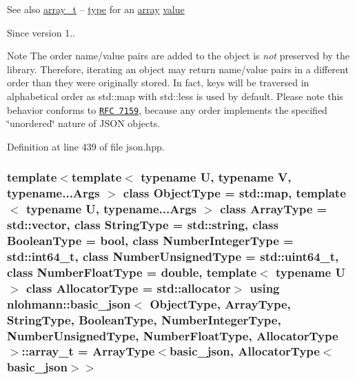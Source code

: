 \begin{DoxySeeAlso}{See also}
\hyperlink{classnlohmann_1_1basic__json_ab00b882d39306d663c23dab110f5cae0}{array\+\_\+t} -- \hyperlink{classnlohmann_1_1basic__json_a848cbae3bd3502ffbf738320bf5eb3aa}{type} for an \hyperlink{classnlohmann_1_1basic__json_a5685815624b086caa532f41e853d4b0f}{array} \hyperlink{classnlohmann_1_1basic__json_a0a2cbbd95862a623e7dc5c37e67dead0}{value}
\end{DoxySeeAlso}
\begin{DoxySince}{Since}
version 1..
\end{DoxySince}
\begin{DoxyNote}{Note}
The order name/value pairs are added to the object is {\itshape not} preserved by the library. Therefore, iterating an object may return name/value pairs in a different order than they were originally stored. In fact, keys will be traversed in alphabetical order as {\ttfamily std\+::map} with {\ttfamily std\+::less} is used by default. Please note this behavior conforms to \href{http://rfc7159.net/rfc7159}{\tt R\+F\+C 7159}, because any order implements the specified \char`\"{}unordered\char`\"{} nature of J\+S\+O\+N objects. 
\end{DoxyNote}


Definition at line 439 of file json.\+hpp.

\hypertarget{classnlohmann_1_1basic__json_ab00b882d39306d663c23dab110f5cae0}{}
\subsubsection[{array\+\_\+t}]{\setlength{\rightskip}{0pt plus 5cm}template$<$template$<$ typename U, typename V, typename...\+Args $>$ class Object\+Type = std\+::map, template$<$ typename U, typename...\+Args $>$ class Array\+Type = std\+::vector, class String\+Type  = std\+::string, class Boolean\+Type  = bool, class Number\+Integer\+Type  = std\+::int64\+\_\+t, class Number\+Unsigned\+Type  = std\+::uint64\+\_\+t, class Number\+Float\+Type  = double, template$<$ typename U $>$ class Allocator\+Type = std\+::allocator$>$ using {\bf nlohmann\+::basic\+\_\+json}$<$ Object\+Type, Array\+Type, String\+Type, Boolean\+Type, Number\+Integer\+Type, Number\+Unsigned\+Type, Number\+Float\+Type, Allocator\+Type $>$\+::{\bf array\+\_\+t} =  Array\+Type$<${\bf basic\+\_\+json}, Allocator\+Type$<${\bf basic\+\_\+json}$>$$>$}\label{classnlohmann_1_1basic__json_ab00b882d39306d663c23dab110f5cae0}


